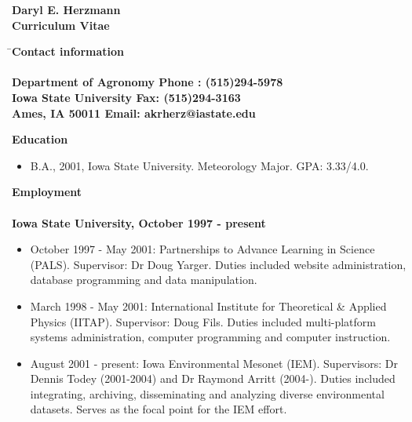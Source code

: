 \renewcommand{\oddsidemargin}{0pt}
\renewcommand{\evensidemargin}{0pt}
\renewcommand{\topmargin}{0pt}
\renewcommand{\headheight}{0pt}
\renewcommand{\headsep}{0pt}
\renewcommand{\textwidth}{468pt}
\renewcommand{\textheight}{230mm}
\hoffset=-60pt
\voffset=-36pt
%
\settowidth{\parindent}{}
\setlength{\parskip}{2mm}
%
\newcommand{\dvd}{\rule{30mm}{0.2mm}}
\newcommand{\beq}{\begin{equation}}
\newcommand{\beqn}{\begin{eqnarray}}
\newcommand{\eeq}{\end{equation}}
\newcommand{\eeqn}{\end{eqnarray}}
\newcommand{\lsf}{\large \sf}
%
\newcommand{\qbar}{\mbox{$\overline{q}$}}
\pagestyle{empty}
%

%
\vspace*{0.25in}
\begin{center}
\LARGE \bf Daryl E. Herzmann\\
\Large \bf Curriculum Vitae\\
\end{center}
\begin{tabbing}
\= \Large \bf Contact information \hspace*{2.5in} \= \\
\> \> \\
\> \lsf Department of Agronomy \> \lsf Phone : (515)294-5978\\
\> \lsf Iowa State University \> \lsf Fax: (515)294-3163\\
\> \lsf Ames, IA 50011 \> \lsf Email: akrherz@iastate.edu \\
\end{tabbing}
\Large \bf Education
\normalsize \sf
\begin{itemize}
\item B.A., 2001, Iowa State University.  Meteorology Major. GPA: 3.33/4.0.
\end{itemize}
\Large \bf Employment\\ \\
\normalsize \bf Iowa State University, October 1997 - present
\normalsize \sf
\begin{itemize}
\item October 1997 - May 2001: Partnerships to Advance Learning in Science
(PALS).  Supervisor: Dr Doug Yarger.  Duties included website administration,
database programming and data manipulation.
\item March 1998 - May 2001: International Institute for Theoretical \& Applied 
Physics (IITAP).  Supervisor: Doug Fils. Duties included multi-platform 
systems administration, computer programming and computer instruction.
\item August 2001 - present: Iowa Environmental Mesonet (IEM). Supervisors:
Dr Dennis Todey (2001-2004) and Dr Raymond Arritt (2004-).  Duties included integrating, archiving,
disseminating and analyzing diverse environmental datasets.  Serves as the
focal point for the IEM effort.
\end{itemize}
